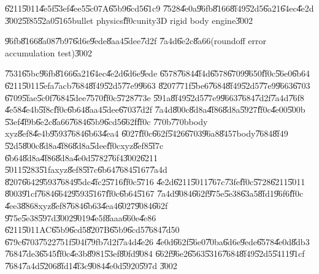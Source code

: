 \begin{case}
\U{6211}\U{5011}\U{4e5f}\U{53ef}\U{4ee5}\U{5c07}A\U{65b9}\U{6cd5}\U{61c9}%
\U{7528}\U{4e0a}\U{96fb}\U{8166}\U{8f49}\U{52d5}\U{6a21}\U{64ec}\U{4e2d}%
\U{3002}\U{5f85}\U{52a0}\U{5165}bullet physics\U{ff0c}unity3D rigid body
engine\U{3002}
\end{case}

\clearpage%

\begin{case}
\U{96fb}\U{8166}\U{8a08}\U{7b97}\U{6d6e}\U{9ede}\U{8aa4}\U{5dee}\U{7d2f}%
\U{7a4d}\U{6e2c}\U{8a66}(roundoff error accumulation test)\U{3002}
\end{case}

\U{7531}\U{65bc}\U{96fb}\U{8166}\U{6a21}\U{64ec}\U{4e2d}\U{6d6e}\U{9ede}%
\U{6578}\U{7684}\U{4f4d}\U{6578}\U{6709}\U{9650}\U{ff0c}\U{56e0}\U{6b64}%
\U{6211}\U{5011}\U{5efa}\U{7acb}\U{7684}\U{8f49}\U{52d5}\U{77e9}\U{9663}%
\U{8207}\U{771f}\U{5be6}\U{7684}\U{8f49}\U{52d5}\U{77e9}\U{9663}\U{6703}%
\U{6709}\U{5fae}\U{5c0f}\U{7684}\U{5dee}\U{7570}\U{ff0c}\U{5728}\U{773e}%
\U{591a}\U{8f49}\U{52d5}\U{77e9}\U{9663}\U{7684}\U{7d2f}\U{7a4d}\U{76f8}%
\U{4e58}\U{4e4b}\U{5f8c}\U{ff0c}\U{6b64}\U{8aa4}\U{5dee}\U{6703}\U{7d2f}%
\U{7a4d}\U{800c}\U{8d8a}\U{4f86}\U{8d8a}\U{5927}\U{ff0c}\U{4e00}\U{500b}%
\U{53ef}\U{4f9b}\U{6e2c}\U{8a66}\U{7684}\U{65b9}\U{6cd5}\U{662f}\U{ff0c}%
\U{770b}\U{770b}body xyz\U{8ef8}\U{4e4b}\U{9593}\U{7684}\U{6b63}\U{4ea4}%
\U{6027}\U{ff0c}\U{662f}\U{5426}\U{6703}\U{96a8}\U{8457}body\U{7684}\U{8f49}%
\U{52d5}\U{800c}\U{8d8a}\U{4f86}\U{8d8a}\U{5dee}\U{ff0c}xyz\U{8ef8}\U{5f7c}%
\U{6b64}\U{8d8a}\U{4f86}\U{8d8a}\U{4e0d}\U{5782}\U{76f4}\U{3002}\U{6211}%
\U{5011}\U{5283}\U{51fa}xyz\U{8ef8}\U{5f7c}\U{6b64}\U{7684}\U{5167}\U{7a4d}%
\U{8207}\U{6642}\U{9593}\U{7684}\U{95dc}\U{4fc2}\U{5716}\U{ff0c}\U{5716}%
\U{4e2d}\U{6211}\U{5011}\U{767c}\U{73fe}\U{ff0c}\U{5728}\U{6211}\U{5011}%
\U{8003}\U{91cf}\U{7684}\U{6642}\U{9593}\U{5167}\U{ff0c}\U{6b64}\U{5167}%
\U{7a4d}\U{9084}\U{662f}\U{975e}\U{5e38}\U{63a5}\U{8fd1}\U{96f6}\U{ff0c}%
\U{4ee3}\U{8868}xyz\U{8ef8}\U{7684}\U{6b63}\U{4ea4}\U{6027}\U{9084}\U{662f}%
\U{975e}\U{5e38}\U{597d}\U{3002}\U{9019}\U{4e5f}\U{8aaa}\U{660e}\U{4e86}%
\U{6211}\U{5011}AC\U{65b9}\U{6cd5}\U{8207}B\U{65b9}\U{6cd5}\U{7684}\U{7d50}%
\U{679c}\U{6703}\U{7522}\U{751f}\U{504f}\U{79fb}\U{7d2f}\U{7a4d}\U{4e26}%
\U{4e0d}\U{662f}\U{56e0}\U{70ba}\U{6d6e}\U{9ede}\U{6578}\U{4e0d}\U{8db3}%
\U{7684}\U{7de3}\U{6545}\U{ff0c}\U{4e3b}\U{8981}\U{53ef}\U{80fd}\U{9084}%
\U{662f}\U{96e2}\U{6563}\U{5316}\U{7684}\U{8f49}\U{52d5}\U{5411}\U{91cf}%
\U{7684}\U{7a4d}\U{5206}\U{8fd1}\U{4f3c}\U{9084}\U{4e0d}\U{5920}\U{597d}%
\U{3002}


